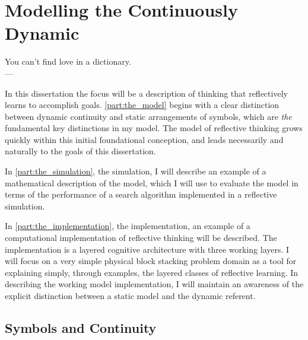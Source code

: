\chapter{Modelling the Continuously Dynamic}
\label{chapter:modelling_the_continuously_dynamic}

\vspace{5mm}
\begin{center}
You can't find love in a dictionary. \\ \medskip
    --- \cite{dennett:2009}
\end{center}
\vspace{5mm}

In this dissertation the focus will be a description of thinking that
reflectively learns to accomplish goals.  \autoref{part:the_model}
begins with a clear distinction between dynamic continuity and static
arrangements of symbols, which are \emph{the} fundamental key
distinctions in my model.  The model of reflective thinking grows
quickly within this initial foundational conception, and leads
necessarily and naturally to the goals of this dissertation.

In \autoref{part:the_simulation}, the simulation, I will describe an
example of a mathematical description of the model, which I will use
to evaluate the model in terms of the performance of a search
algorithm implemented in a reflective simulation.

In \autoref{part:the_implementation}, the implementation, an example
of a computational implementation of reflective thinking will be
described.  The implementation is a layered cognitive architecture
with three working layers.  I will focus on a very simple physical
block stacking problem domain as a tool for explaining simply, through
examples, the layered classes of reflective learning.  In describing
the working model implementation, I will maintain an awareness of the
explicit distinction between a static model and the dynamic referent.

\section{Symbols and Continuity}

